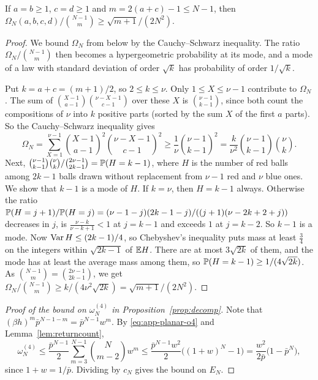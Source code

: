 \begin{lemma}\label{lem:balanced}
If $a=b\ge1$, $c=d\ge1$ and $m=2(a+c)-1\le N-1$, then
$\Omega_N(a,b,c,d)/\binom{N-1}m\ge\sqrt{m+1}/(2N^2)$.
\end{lemma}

\begin{proof}
We bound $\Omega_N$ from below by the Cauchy--Schwarz inequality. The ratio
$\Omega_N/\binom{N-1}m$ then becomes a hypergeometric probability at its mode, and a mode of a law
with standard deviation of order $\sqrt k$ has probability of order $1/\sqrt k$.

Put $k=a+c=(m+1)/2$, so $2\le k\le\nu$. Only $1\le X\le\nu-1$ contribute to $\Omega_N$. The sum of
$\binom{X-1}{a-1}\binom{\nu-X-1}{c-1}$ over these $X$ is $\binom{\nu-1}{k-1}$, since both count the
compositions of $\nu$ into $k$ positive parts (sorted by the sum $X$ of the first $a$ parts). So the
Cauchy--Schwarz inequality gives
\[
 \Omega_N=\sum_{X=1}^{\nu-1}\binom{X-1}{a-1}^2\binom{\nu-X-1}{c-1}^2
 \ge\frac1\nu\binom{\nu-1}{k-1}^2=\frac k{\nu^2}\binom{\nu-1}{k-1}\binom\nu k .
\]
Next, $\binom{\nu-1}{k-1}\binom\nu k/\binom{2\nu-1}{2k-1}=\mathbb{P}(H=k-1)$, where $H$ is the number of
red balls among $2k-1$ balls drawn without replacement from $\nu-1$ red and $\nu$ blue ones. We show
that $k-1$ is a mode of $H$. If $k=\nu$, then $H=k-1$ always. Otherwise the ratio
$\mathbb{P}(H=j+1)/\mathbb{P}(H=j)=(\nu-1-j)(2k-1-j)/((j+1)(\nu-2k+2+j))$ decreases in $j$, is $\frac{\nu-k}{\nu-k+1}<1$ at $j=k-1$ and exceeds $1$ at $j=k-2$. So $k-1$ is a
mode. Now $\operatorname{Var} H\le(2k-1)/4$, so Chebyshev's inequality puts mass at least $\frac34$ on the
integers within $\sqrt{2k-1}$ of $\mathbb{E} H$. There are at most $3\sqrt{2k}$ of them, and the mode has
at least the average mass among them, so $\mathbb{P}(H=k-1)\ge1/(4\sqrt{2k})$. As
$\binom{N-1}m=\binom{2\nu-1}{2k-1}$, we get
$\Omega_N/\binom{N-1}m\ge k/(4\nu^2\sqrt{2k})=\sqrt{m+1}/(2N^2)$.
\end{proof}

\begin{proof}[Proof of the bound on $\omega^{(4)}_N$ in Proposition~\ref{prop:decomp}]
Note that $(\beta h)^m\bar p^{N-1-m}=\bar p^{N-1}w^m$. By \eqref{eq:app-planar-o4} and
Lemma~\ref{lem:returncount},
\[
 \omega^{(4)}_N\le\frac{\bar p^{N-1}}2\sum_{m=3}^{N-1}\binom N{m-2}w^m
 \le\frac{\bar p^{N-1}w^2}2\bigl((1+w)^N-1\bigr)=\frac{w^2}{2\bar p}\bigl(1-\bar p^N\bigr),
\]
since $1+w=1/\bar p$. Dividing by $c_N$ gives the bound on $E_N$.
\end{proof}

